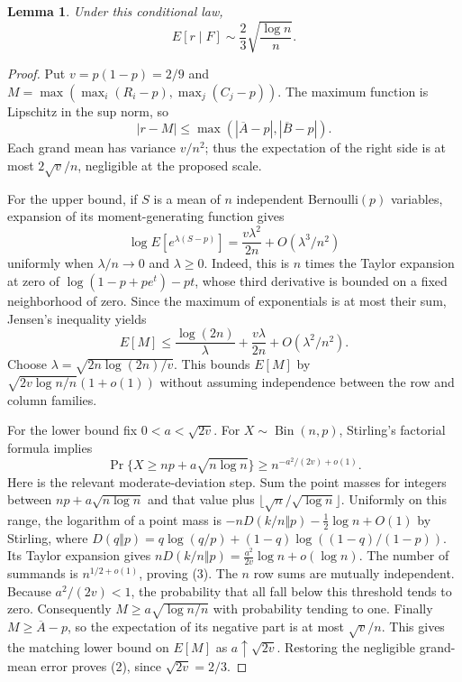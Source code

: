 \documentclass[11pt]{article}
\newtheorem{lemma}[theorem]{Lemma}
\theoremstyle{definition}
\begin{document}
\begin{lemma}
Under this conditional law,
\[
 E[r\mid F]\sim\frac23\sqrt{\frac{\log n}{n}}.           \tag{2}
\]
\end{lemma}
\begin{proof}
Put $v=p(1-p)=2/9$ and
$M=\max(\max_i(R_i-p),\max_j(C_j-p))$.
The maximum function is Lipschitz in the sup norm, so
\[
 |r-M|\le\max(|\overline A-p|,|\overline B-p|).
\]
Each grand mean has variance $v/n^2$; thus the expectation of the
right side is at most $2\sqrt v/n$, negligible at the proposed scale.

For the upper bound, if $S$ is a mean of $n$ independent Bernoulli$(p)$
variables, expansion of its moment-generating function gives
\[
 \log E[e^{\lambda(S-p)}]
   =\frac{v\lambda^2}{2n}+O(\lambda^3/n^2)
\]
uniformly when $\lambda/n\to0$ and $\lambda\ge0$. Indeed, this is
$n$ times the Taylor expansion at zero of
$\log(1-p+pe^t)-pt$, whose third derivative is bounded on a fixed
neighborhood of zero. Since the maximum of exponentials is at most
their sum, Jensen's inequality yields
\[
 E[M]\le\frac{\log(2n)}{\lambda}
        +\frac{v\lambda}{2n}+O(\lambda^2/n^2).
\]
Choose $\lambda=\sqrt{2n\log(2n)/v}$. This bounds $E[M]$ by
$\sqrt{2v\log n/n}(1+o(1))$ without assuming independence between
the row and column families.

For the lower bound fix $0<a<\sqrt{2v}$. For
$X\sim\operatorname{Bin}(n,p)$, Stirling's factorial formula implies
\[
 \Pr\{X\ge np+a\sqrt{n\log n}\}
       \ge n^{-a^2/(2v)+o(1)}.                           \tag{3}
\]
Here is the relevant moderate-deviation step. Sum the point masses
for integers between $np+a\sqrt{n\log n}$ and that value plus
$\lfloor\sqrt n/\sqrt{\log n}\rfloor$. Uniformly on this range,
the logarithm of a point mass is
$-nD(k/n\Vert p)-\frac12\log n+O(1)$ by Stirling, where
$D(q\Vert p)=q\log(q/p)+(1-q)\log((1-q)/(1-p))$.
Its Taylor expansion gives
$nD(k/n\Vert p)=\frac{a^2}{2v}\log n+o(\log n)$.
The number of summands is $n^{1/2+o(1)}$, proving (3).
The $n$ row sums are mutually independent. Because $a^2/(2v)<1$,
the probability that all fall below this threshold tends to zero.
Consequently $M\ge a\sqrt{\log n/n}$ with probability tending to
one. Finally $M\ge\overline A-p$, so the expectation of its negative
part is at most $\sqrt v/n$. This gives the matching lower bound
on $E[M]$ as $a\uparrow\sqrt{2v}$. Restoring the negligible grand-mean
error proves (2), since $\sqrt{2v}=2/3$.
\end{proof}
\end{document}
